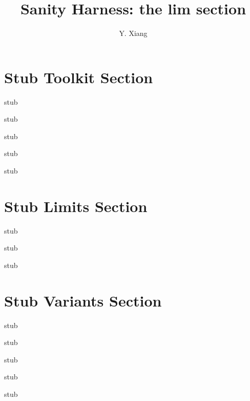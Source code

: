 \documentclass[runningheads,envcountsect]{llncs}
\title{Sanity Harness: the lim section}
\author{Y. Xiang}
\institute{}
\begin{document}
\maketitle

\section{Stub Toolkit Section}
\label{sec:toolkit}
\begin{definition}\label{def:exp}stub\end{definition}
\begin{definition}\label{def:den}stub\end{definition}
\begin{definition}\label{def:subst}stub\end{definition}
\begin{lemma}\label{lem:beta}stub\end{lemma}
\begin{theorem}\label{thm:totality}stub\end{theorem}

\section{Stub Limits Section}
\label{sec:limits}
\begin{proposition}\label{prop:pipeline}stub\end{proposition}
\begin{lemma}\label{lem:length}stub\end{lemma}
\begin{theorem}\label{thm:fp}stub\end{theorem}

\section{Stub Variants Section}
\label{sec:variants}
\begin{definition}\label{def:markov}stub\end{definition}
\begin{theorem}\label{thm:termination}stub\end{theorem}
\begin{theorem}\label{thm:amplifier}stub\end{theorem}
\begin{corollary}\label{cor:towers}stub\end{corollary}
\begin{conjecture}\label{conj:ic}stub\end{conjecture}
\end{document}
